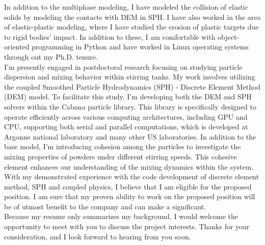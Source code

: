 \documentclass[11pt,a4paper,roman]{moderncv}
\begin{document}
\vspace{1em}
In addition to the multiphase modeling, I have modeled the collision of elastic
solids by modeling the contacts with DEM in SPH. I have also worked in the area
of elastic-plastic modeling, where I have studied the erosion of plastic targets
due to rigid bodies' impact. In addition to these, I am comfortable with
object-oriented programming in Python and have worked in Linux operating systems
through out my Ph.D. tenure.\\


\vspace{1em} I'm presently engaged in postdoctoral research focusing on studying
particle dispersion and mixing behavior within stirring tanks. My work involves
utilizing the coupled Smoothed Particle Hydrodynamics (SPH) - Discrete Element
Method (DEM) model. To facilitate this study, I'm developing both the DEM and
SPH solvers within the Cabana particle library. This library is specifically
designed to operate efficiently across various computing architectures,
including GPU and CPU, supporting both serial and parallel computations, which
is developed at Argonne national laboratory and many other US laboratories.  In
addition to the base model, I'm introducing cohesion among the particles to
investigate the mixing properties of powders under different stirring
speeds. This cohesive element enhances our understanding of the mixing dynamics
within the system. \\


\vspace{1em} With my demonstrated experience with the code development of
discrete element method, SPH and coupled physics, I believe that I am eligible
for the proposed position. I am sure that my proven ability to work on the
proposed position will be of utmost benefit to the company and can make a
significant.\\


\vspace{1em}
Because my resume only summarizes my background, I would welcome the opportunity
to meet with you to discuss the project interests. Thanks for your
consideration, and I look forward to hearing from you soon.\\



\vspace{0.5cm}


\makeletterclosing
\end{document}
